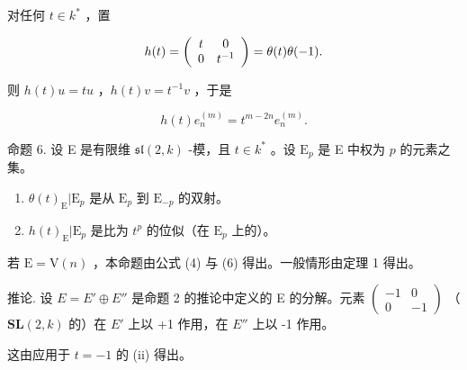 对任何 \(t\in k^{*}\) ，置

\[
h (t) = \left( \begin{array}{c c} t & 0 \\ 0 & t ^ {- 1} \end{array} \right) = \theta (t) \theta (- 1).
\]

则 \(h(t)u = tu\) ，\(h(t)v = t^{-1}v\) ，于是

\[
h (t) e _ {n} ^ {(m)} = t ^ {m - 2 n} e _ {n} ^ {(m)}.\tag{6}
\]

命题 6. 设 E 是有限维 \(\mathfrak{sl}(2,k)\) -模，且 \(t\in k^{*}\) 。设 \(\mathrm{E}_p\) 是 E 中权为 \(p\) 的元素之集。

\begin{enumerate}
\def\labelenumi{(\roman{enumi})}
\item
  \(\theta(t)_{\mathrm{E}}|\mathrm{E}_{p}\) 是从 \(\mathrm{E}_p\) 到 \(\mathrm{E}_{-p}\) 的双射。
\item
  \(h(t)_{\mathrm{E}}|\mathrm{E}_p\) 是比为 \(t^p\) 的位似（在 \(\mathrm{E}_p\) 上的）。
\end{enumerate}

若 \(\mathrm{E} = \mathrm{V}(n)\) ，本命题由公式 (4) 与 (6) 得出。一般情形由定理 1 得出。

推论. 设 \(E = E' \oplus E''\) 是命题 2 的推论中定义的 E 的分解。元素 \(\begin{pmatrix}-1 & 0 \\ 0 & -1\end{pmatrix}\) （\(\mathbf{SL}(2, k)\) 的）在 \(E'\) 上以 +1 作用，在 \(E''\) 上以 -1 作用。

这由应用于 \(t = -1\) 的 (ii) 得出。

